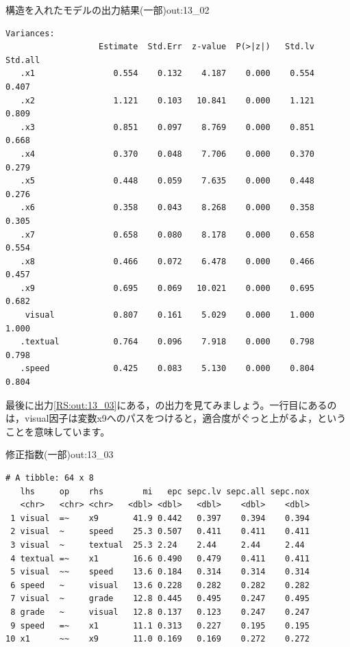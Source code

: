 \documentclass{ltjsbook}
\begin{document}
\begin{Rscreen}{構造を入れたモデルの出力結果(一部)}{out:13_02}
\begin{verbatim}
Variances:
                   Estimate  Std.Err  z-value  P(>|z|)   Std.lv  Std.all
   .x1                0.554    0.132    4.187    0.000    0.554    0.407
   .x2                1.121    0.103   10.841    0.000    1.121    0.809
   .x3                0.851    0.097    8.769    0.000    0.851    0.668
   .x4                0.370    0.048    7.706    0.000    0.370    0.279
   .x5                0.448    0.059    7.635    0.000    0.448    0.276
   .x6                0.358    0.043    8.268    0.000    0.358    0.305
   .x7                0.658    0.080    8.178    0.000    0.658    0.554
   .x8                0.466    0.072    6.478    0.000    0.466    0.457
   .x9                0.695    0.069   10.021    0.000    0.695    0.682
    visual            0.807    0.161    5.029    0.000    1.000    1.000
   .textual           0.764    0.096    7.918    0.000    0.798    0.798
   .speed             0.425    0.083    5.130    0.000    0.804    0.804
\end{verbatim}
\end{Rscreen}

最後に出力\ref{RS:out:13_03}にある，の出力を見てみましょう。一行目にあるのは，visual因子は変数x9へのパスをつけると，適合度がぐっと上がるよ，ということを意味しています。
\begin{Rscreen}{修正指数(一部)}{out:13_03}
	\begin{verbatim}
# A tibble: 64 x 8
   lhs     op    rhs        mi   epc sepc.lv sepc.all sepc.nox
   <chr>   <chr> <chr>   <dbl> <dbl>   <dbl>    <dbl>    <dbl>
 1 visual  =~    x9       41.9 0.442   0.397    0.394    0.394
 2 visual  ~     speed    25.3 0.507   0.411    0.411    0.411
 3 visual  ~     textual  25.3 2.24    2.44     2.44     2.44 
 4 textual =~    x1       16.6 0.490   0.479    0.411    0.411
 5 visual  ~~    speed    13.6 0.184   0.314    0.314    0.314
 6 speed   ~     visual   13.6 0.228   0.282    0.282    0.282
 7 visual  ~     grade    12.8 0.445   0.495    0.247    0.495
 8 grade   ~     visual   12.8 0.137   0.123    0.247    0.247
 9 speed   =~    x1       11.1 0.313   0.227    0.195    0.195
10 x1      ~~    x9       11.0 0.169   0.169    0.272    0.272
\end{verbatim}
\end{Rscreen}
\end{document}
